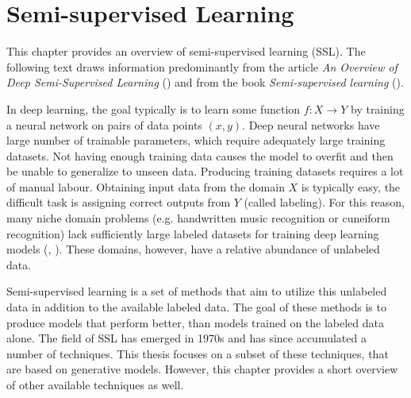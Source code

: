 \chapter{Semi-supervised Learning}
\label{chap:SemisupervisedLearning}

This chapter provides an overview of semi-supervised learning (SSL). The following text draws information predominantly from the article \emph{An Overview of Deep Semi-Supervised Learning} (\cite{SemisupervisedOverview}) and from the book \emph{Semi-supervised learning} (\cite{SslBook}).

In deep learning, the goal typically is to learn some function $f: X \rightarrow Y$ by training a neural network on pairs of data points $(x, y)$. Deep neural networks have large number of trainable parameters, which require adequately large training datasets. Not having enough training data causes the model to overfit and then be unable to generalize to unseen data. Producing training datasets requires a lot of manual labour. Obtaining input data from the domain $X$ is typically easy, the difficult task is assigning correct outputs from $Y$ (called labeling). For this reason, many niche domain problems (e.g. handwritten music recognition or cuneiform recognition) lack sufficiently large labeled datasets for training deep learning models (\cite{MuscimaPP}, \cite{Cuneiforms}). These domains, however, have a relative abundance of unlabeled data.

Semi-supervised learning is a set of methods that aim to utilize this unlabeled data in addition to the available labeled data. The goal of these methods is to produce models that perform better, than models trained on the labeled data alone. The field of SSL has emerged in 1970s and has since accumulated a number of techniques. This thesis focuses on a subset of these techniques, that are based on generative models. However, this chapter provides a short overview of other available techniques as well.

